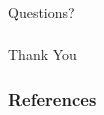 \documentclass[aspectratio=169, 8 pt]{beamer}
\begin{document}
	
	\begin{frame}
		\frametitle{\null}
		\centering
		\Huge
		Questions?
	\end{frame}
	
	\begin{frame}
		\frametitle{\null}
		\centering
		\Huge
		Thank You
	\end{frame}
	
	\begin{frame}[allowframebreaks]
		\frametitle{References}
		\nocite{*}
		
		
	\end{frame}
\end{document}
